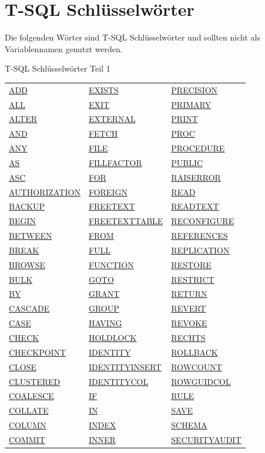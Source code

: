 \documentclass[12pt,ngerman,a4paper,index=totoc,twoside]{scrartcl}
\newcommand{\indexlink}[1]{\index{#1\protect\hypertarget{#1}{}}\hyperlink{#1}{#1}}
\begin{document}
\section{T-SQL Schlüsselwörter}

Die folgenden Wörter sind T-SQL Schlüsselwörter und sollten nicht als Variablennamen genutzt werden. 

\begin{center}
\captionsetup{type=table}
\caption{T-SQL Schlüsselwörter Teil 1}
\begin{tabular}{p{5cm}p{5cm}p{5cm}} 
\indexlink{ADD} & \indexlink{EXISTS} & \indexlink{PRECISION} \\ 
\indexlink{ALL} & \indexlink{EXIT} & \indexlink{PRIMARY} \\ 
\indexlink{ALTER} & \indexlink{EXTERNAL} & \indexlink{PRINT} \\ 
\indexlink{AND} & \indexlink{FETCH} & \indexlink{PROC}\\ 
\indexlink{ANY} & \indexlink{FILE} & \indexlink{PROCEDURE} \\ 
\indexlink{AS} & \indexlink{FILLFACTOR} & \indexlink{PUBLIC} \\ 
\indexlink{ASC} & \indexlink{FOR} & \indexlink{RAISERROR} \\ 
\indexlink{AUTHORIZATION} & \indexlink{FOREIGN} & \indexlink{READ} \\ 
\indexlink{BACKUP} & \indexlink{FREETEXT} & \indexlink{READTEXT} \\ 
\indexlink{BEGIN} & \indexlink{FREETEXTTABLE} & \indexlink{RECONFIGURE} \\ 
\indexlink{BETWEEN} & \indexlink{FROM} & \indexlink{REFERENCES} \\ 
\indexlink{BREAK} & \indexlink{FULL} & \indexlink{REPLICATION} \\ 
\indexlink{BROWSE} & \indexlink{FUNCTION} & \indexlink{RESTORE} \\ 
\indexlink{BULK} & \indexlink{GOTO} & \indexlink{RESTRICT} \\ 
\indexlink{BY} & \indexlink{GRANT} & \indexlink{RETURN} \\ 
\indexlink{CASCADE} & \indexlink{GROUP} & \indexlink{REVERT} \\ 
\indexlink{CASE} & \indexlink{HAVING} & \indexlink{REVOKE} \\ 
\indexlink{CHECK} & \indexlink{HOLDLOCK} & \indexlink{RECHTS} \\ 
\indexlink{CHECKPOINT} & \indexlink{IDENTITY} & \indexlink{ROLLBACK} \\ 
\indexlink{CLOSE} & \indexlink{IDENTITY\textunderscore INSERT} & \indexlink{ROWCOUNT} \\ 
\indexlink{CLUSTERED} & \indexlink{IDENTITYCOL} & \indexlink{ROWGUIDCOL} \\ 
\indexlink{COALESCE} & \indexlink{IF} & \indexlink{RULE} \\ 
\indexlink{COLLATE} & \indexlink{IN} & \indexlink{SAVE} \\ 
\indexlink{COLUMN} & \indexlink{INDEX} & \indexlink{SCHEMA} \\ 
\indexlink{COMMIT} & \indexlink{INNER} & \indexlink{SECURITYAUDIT} \\ 


\end{tabular}
\end{center}
\end{document}

